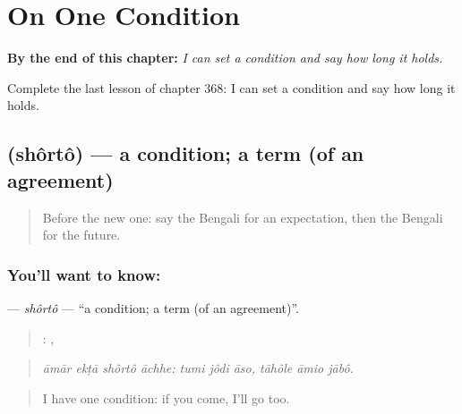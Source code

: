 
\chapter{On One Condition}
\label{ch:bn-on-one-condition}

\begin{chapteropening}
\textbf{By the end of this chapter:} \emph{I can set a condition and say how long it holds.}

Complete the last lesson of chapter 368: I can set a condition and say how long it holds.
\end{chapteropening}

\section[\texorpdfstring{\bn{শর্ত} (shôrtô)}{শর্ত (shôrtô)}]{ (shôrtô) — a condition; a term (of an agreement)}

\label{lesson:BN-C368-shorto}



\begin{quote}
Before the new one: say the Bengali for an expectation, then the Bengali for the future.
\end{quote}

\subsection*{You'll want to know: }
\textbf{} — \emph{shôrtô} — \textquotedblleft{}a condition; a term (of an agreement)\textquotedblright{}.

\begin{quote}
   :   ,   
\end{quote}

\begin{quote}
\emph{āmār ekṭā shôrtô āchhe: tumi jôdi āso, tāhôle āmio jābô.}
\end{quote}

\begin{quote}
I have one condition: if you come, I'll go too.
\end{quote}


